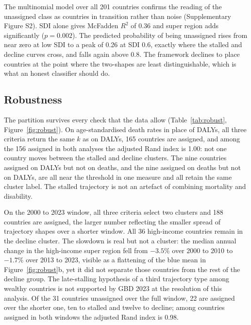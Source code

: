 \documentclass[11pt,a4paper]{article}
\begin{document}
\begin{table}[t]
\centering\small
\caption{Attribution of membership (sustained decline versus stalled, assigned countries only). Likelihood ratio tests: SDI versus intercept, $p < 0.0001$; region added to SDI, $p = 0.0005$; interval width added to SDI, $p = 0.011$; interval width added to SDI and region, $p = 0.11$.}
\label{tab:attr}
\end{table}

The multinomial model over all 201 countries confirms the reading of the unassigned class as countries in transition rather than noise (Supplementary Figure S2). SDI alone gives McFadden $R^2$ of 0.36 and super region adds significantly ($p = 0.002$). The predicted probability of being unassigned rises from near zero at low SDI to a peak of 0.26 at SDI 0.6, exactly where the stalled and decline curves cross, and falls again above 0.8. The framework declines to place countries at the point where the two-shapes are least distinguishable, which is what an honest classifier should do.


\subsection{Robustness}

The partition survives every check that the data allow (Table~\ref{tab:robust}, Figure~\ref{fig:robust}). On age-standardised death rates in place of DALYs, all three criteria return the same $k$ as on DALYs, 165 countries are assigned, and among the 156 assigned in both analyses the adjusted Rand index is 1.00: not one country moves between the stalled and decline clusters. The nine countries assigned on DALYs but not on deaths, and the nine assigned on deaths but not on DALYs, are all near the threshold in one measure and all retain the same cluster label. The stalled trajectory is not an artefact of combining mortality and disability.

On the 2000 to 2023 window, all three criteria select two clusters and 188 countries are assigned, the larger number reflecting the smaller spread of trajectory shapes over a shorter window. All 36 high-income countries remain in the decline cluster. The slowdown is real but not a cluster: the median annual change in the high-income super region fell from $-3.5\%$ over 2000 to 2010 to $-1.7\%$ over 2013 to 2023, visible as a flattening of the blue mean in Figure~\ref{fig:robust}b, yet it did not separate those countries from the rest of the decline group. The late-stalling hypothesis of a third trajectory type among wealthy countries is not supported by GBD 2023 at the resolution of this analysis. Of the 31 countries unassigned over the full window, 22 are assigned over the shorter one, ten to stalled and twelve to decline; among countries assigned in both windows the adjusted Rand index is 0.98.
\end{document}
